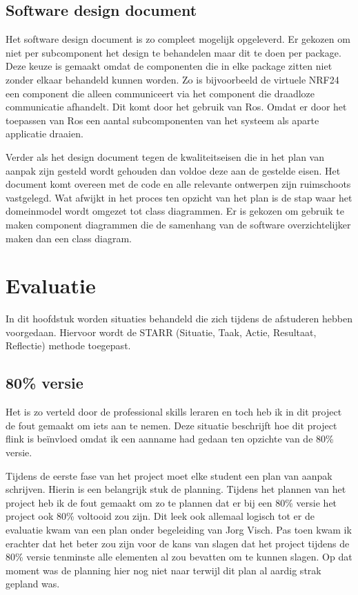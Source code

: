 \documentclass[a4paper, 11pt, oneside]{report}
\begin{document}
\section{Software design document}\label{sec:software-design-document}
Het software design document is zo compleet mogelijk opgeleverd.
Er gekozen om niet per subcomponent het design te behandelen maar dit te doen per package.
Deze keuze is gemaakt omdat de componenten die in elke package zitten niet zonder elkaar behandeld kunnen worden.
Zo is bijvoorbeeld de virtuele NRF24 een component die alleen communiceert via het component die draadloze communicatie afhandelt.
Dit komt door het gebruik van Ros.
Omdat er door het toepassen van Ros een aantal subcomponenten van het systeem als aparte applicatie draaien.

Verder als het design document tegen de kwaliteitseisen die in het plan van aanpak zijn gesteld wordt gehouden dan voldoe deze aan de gestelde eisen.
Het document komt overeen met de code en alle relevante ontwerpen zijn ruimschoots vastgelegd.
Wat afwijkt in het proces ten opzicht van het plan is de stap waar het domeinmodel wordt omgezet tot class diagrammen. 
Er is gekozen om gebruik te maken component diagrammen die de samenhang van de software overzichtelijker maken dan een class diagram. 


\chapter{Evaluatie}\label{sec:evaluatie}
In dit hoofdstuk worden situaties behandeld die zich tijdens de afstuderen hebben voorgedaan. 
Hiervoor wordt de STARR (Situatie, Taak, Actie, Resultaat, Reflectie) methode toegepast. 

\section{80\% versie}\label{sec:altijd-navragen-nooit-aannemen}
Het is zo verteld door de professional skills leraren en toch heb ik in dit project de fout gemaakt om iets aan te nemen.
Deze situatie beschrijft hoe dit project flink is beïnvloed omdat ik een aanname had gedaan ten opzichte van de 80\% versie.

Tijdens de eerste fase van het project moet elke student een plan van aanpak schrijven. Hierin is een belangrijk stuk de planning. Tijdens het plannen van het project heb ik de fout gemaakt om zo te plannen dat er bij een 80\% versie het project ook 80\% voltooid zou zijn. Dit leek ook allemaal logisch tot er de evaluatie kwam van een plan onder begeleiding van Jorg Visch. Pas toen kwam ik erachter dat het beter zou zijn voor de kans van slagen dat het project tijdens de 80\% versie tenminste alle elementen al zou bevatten om te kunnen slagen. 
Op dat moment was de planning hier nog niet naar terwijl dit plan al aardig strak gepland was.
\end{document}
